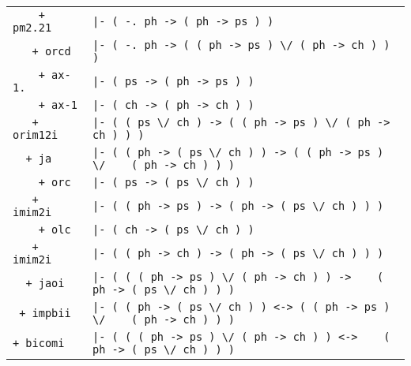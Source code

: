 \documentclass{article}
\begin{document}
\begin{tabular}{ |l|p{105mm}| }
\hline
\verb!    + pm2.21! & \verb!|- ( -. ph -> ( ph -> ps ) )! \\
\verb!   + orcd   ! & \verb!|- ( -. ph -> ( ( ph -> ps ) \/ ( ph -> ch ) ) )! \\
\verb!    + ax-1. ! & \verb!|- ( ps -> ( ph -> ps ) )! \\
\verb!    + ax-1  ! & \verb!|- ( ch -> ( ph -> ch ) )! \\
\verb!   + orim12i! & \verb!|- ( ( ps \/ ch ) -> ( ( ph -> ps ) \/ ( ph -> ch ) ) )! \\
\verb!  + ja      ! & \verb!|- ( ( ph -> ( ps \/ ch ) ) -> ( ( ph -> ps ) \/ !\newline\verb!   ( ph -> ch ) ) )! \\
\verb!    + orc   ! & \verb!|- ( ps -> ( ps \/ ch ) )! \\
\verb!   + imim2i ! & \verb!|- ( ( ph -> ps ) -> ( ph -> ( ps \/ ch ) ) )! \\
\verb!    + olc   ! & \verb!|- ( ch -> ( ps \/ ch ) )! \\
\verb!   + imim2i ! & \verb!|- ( ( ph -> ch ) -> ( ph -> ( ps \/ ch ) ) )! \\
\verb!  + jaoi    ! & \verb!|- ( ( ( ph -> ps ) \/ ( ph -> ch ) ) -> !\newline\verb!   ( ph -> ( ps \/ ch ) ) )! \\
\verb! + impbii   ! & \verb!|- ( ( ph -> ( ps \/ ch ) ) <-> ( ( ph -> ps ) \/ !\newline\verb!   ( ph -> ch ) ) )! \\
\verb!+ bicomi    ! & \verb!|- ( ( ( ph -> ps ) \/ ( ph -> ch ) ) <-> !\newline\verb!   ( ph -> ( ps \/ ch ) ) )! \\
\hline
\end{tabular}
\end{document}
